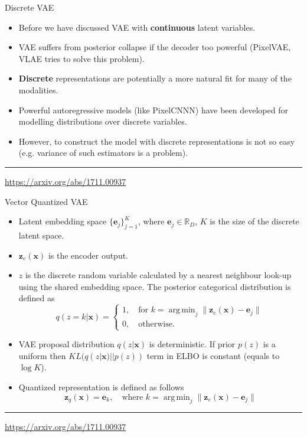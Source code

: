 \documentclass{beamer}
\newcommand{\be}{\mathbf{e}}
\newcommand{\bx}{\mathbf{x}}
\newcommand{\bz}{\mathbf{z}}
\newcommand{\bbR}{\mathbb{R}}
\DeclareMathOperator*{\argmin}{arg\,min}
\begin{document}
\begin{frame}{Discrete VAE}
	\begin{itemize}
		\item Before we have discussed VAE with \textbf{continuous} latent variables.
		\item VAE suffers from posterior collapse if the decoder too powerful (PixelVAE, VLAE tries to solve this problem).
		\item \textbf{Discrete} representations are potentially a more natural fit for many of the modalities.
		\item Powerful autoregressive models (like PixelCNNN) have been developed for modelling distributions over discrete variables.
		\item However, to construct the model with discrete representations is not so easy (e.g. variance of such estimators is a problem).
	\end{itemize}
	\vfill
	\hrule\medskip
	{\scriptsize \href{https://arxiv.org/abs/1711.00937}{https://arxiv.org/abs/1711.00937}} 
\end{frame}
\begin{frame}{Vector Quantized VAE}
	\begin{itemize}
		\item Latent embedding space $\{\be_j\}_{j=1}^K$, where $\be_j \in \bbR_D$, $K$ is the size of the discrete latent space.
		\item $\bz_e(\bx)$ is the encoder output.
		\item $z$ is the discrete random variable calculated by a nearest neighbour look-up using the shared embedding space. The posterior categorical distribution is defined as 
		\[
			q(z = k | \bx) = \begin{cases}
				1 , \quad \text{for } k = \argmin_j \| \bz_e(\bx) - \be_j \| \\
				0, \quad \text{otherwise}.
			\end{cases}
		\]
		
		\item VAE proposal distribution $q(z | \bx)$ is deterministic. If prior $p(z)$ is a uniform then $KL(q(z| \bx) || p(z))$ term in ELBO is constant (equals to $\log K$).
		\item Quantized representation is defined as follows
		\[
			\bz_q(\bx) = \be_k, \quad \text{where } k = \argmin_j \| \bz_e(\bx) - \be_j \| 
		\] 
		
	\end{itemize}
	\vfill
	\hrule\medskip
	{\scriptsize \href{https://arxiv.org/abs/1711.00937}{https://arxiv.org/abs/1711.00937}} 
\end{frame}
\end{document}
